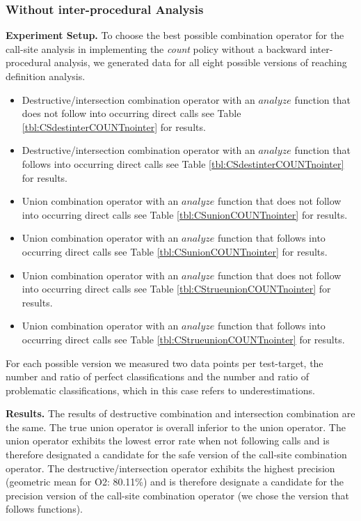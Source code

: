 \subsubsection{Without inter-procedural Analysis}

\textbf{Experiment Setup.}
To choose the best possible combination operator for the call-site analysis in implementing the \textit{count} policy without a backward inter-procedural analysis,
we generated data for all eight possible versions of reaching definition analysis.
\begin{itemize}
\item Destructive/intersection combination operator with an $analyze$ function that does not follow into occurring direct calls see Table \ref{tbl:CSdestinterCOUNTnointer} for results.
\item Destructive/intersection combination operator with an $analyze$ function that follows into occurring direct calls see Table \ref{tbl:CSdestinterCOUNTnointer} for results.
\item Union combination operator with an $analyze$ function that does not follow into occurring direct calls see Table \ref{tbl:CSunionCOUNTnointer} for results.
\item Union combination operator with an $analyze$ function that follows into occurring direct calls see Table \ref{tbl:CSunionCOUNTnointer} for results.
\item Union combination operator with an $analyze$ function that does not follow into occurring direct calls see Table \ref{tbl:CStrueunionCOUNTnointer} for results.
\item Union combination operator with an $analyze$ function that follows into occurring direct calls see Table \ref{tbl:CStrueunionCOUNTnointer} for results.
\end{itemize}
For each possible version we measured two data points per test-target, the number and ratio of perfect classifications and the number and ratio of problematic
classifications, which in this case refers to underestimations.

\textbf{Results.} The results of destructive combination and intersection combination are the same. The true union operator is overall inferior to the union
operator. The union operator exhibits the lowest error rate when not following calls and is therefore  designated a candidate for the safe version of the 
call-site combination operator. The destructive/intersection operator exhibits the highest precision (geometric mean for O2: 80.11\%) and is therefore 
designate a candidate for the precision version of the call-site combination operator (we chose the version that follows functions).

